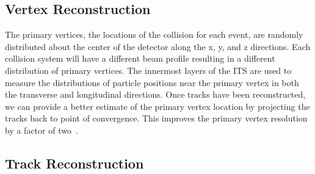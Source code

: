 \subsection{Vertex Reconstruction}

The primary vertices, the locations of the collision for each event, are randomly distributed about the center of the detector along the x, y, and z directions. Each collision system will have a different beam profile resulting in a different distribution of primary vertices. The innermost layers of the ITS are used to measure the distributions of particle positions near the primary vertex in both the transverse and longitudinal directions. Once tracks have been reconstructed, we can provide a better estimate of the primary vertex location by projecting the tracks back to point of convergence. This improves the primary vertex resolution by a factor of two~\cite{trackVertexReconstruction}.

\subsection{Track Reconstruction}


